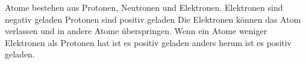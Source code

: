 \documentclass[../Elektrizitaet.tex]{subfiles}
\begin{document}
Atome bestehen aus Protonen, Neutronen und Elektronen.  
Elektronen sind negativ geladen  
Protonen sind positiv geladen  
Die Elektronen können das Atom verlassen und in andere Atome überspringen.  
Wenn ein Atome weniger Elektronen als Protonen hat ist es positiv geladen anders herum ist es positiv geladen.  
\end{document}
